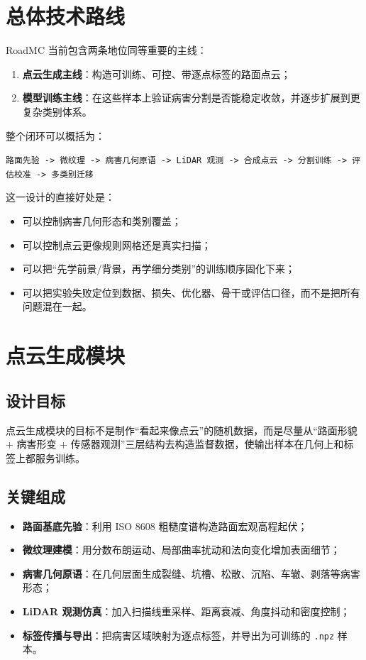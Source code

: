 \documentclass[12pt]{ctexart}
\begin{document}
\section{总体技术路线}

RoadMC 当前包含两条地位同等重要的主线：

\begin{enumerate}
  \item \textbf{点云生成主线}：构造可训练、可控、带逐点标签的路面点云；
  \item \textbf{模型训练主线}：在这些样本上验证病害分割是否能稳定收敛，并逐步扩展到更复杂类别体系。
\end{enumerate}

整个闭环可以概括为：

\begin{center}
\texttt{路面先验 -> 微纹理 -> 病害几何原语 -> LiDAR 观测 -> 合成点云 -> 分割训练 -> 评估校准 -> 多类别迁移}
\end{center}

这一设计的直接好处是：

\begin{itemize}
  \item 可以控制病害几何形态和类别覆盖；
  \item 可以控制点云更像规则网格还是真实扫描；
  \item 可以把“先学前景/背景，再学细分类别”的训练顺序固化下来；
  \item 可以把实验失败定位到数据、损失、优化器、骨干或评估口径，而不是把所有问题混在一起。
\end{itemize}

\section{点云生成模块}

\subsection{设计目标}

点云生成模块的目标不是制作“看起来像点云”的随机数据，而是尽量从“路面形貌 + 病害形变 + 传感器观测”三层结构去构造监督数据，使输出样本在几何上和标签上都服务训练。

\subsection{关键组成}

\begin{itemize}
  \item \textbf{路面基底先验}：利用 ISO 8608 粗糙度谱构造路面宏观高程起伏；
  \item \textbf{微纹理建模}：用分数布朗运动、局部曲率扰动和法向变化增加表面细节；
  \item \textbf{病害几何原语}：在几何层面生成裂缝、坑槽、松散、沉陷、车辙、剥落等病害形态；
  \item \textbf{LiDAR 观测仿真}：加入扫描线重采样、距离衰减、角度抖动和密度控制；
  \item \textbf{标签传播与导出}：把病害区域映射为逐点标签，并导出为可训练的 \texttt{.npz} 样本。
\end{itemize}
\end{document}
